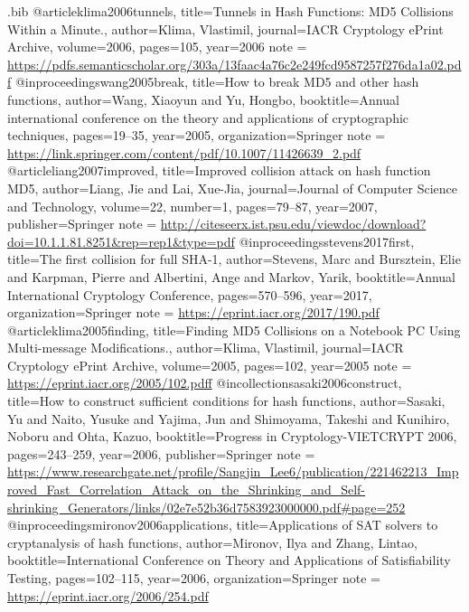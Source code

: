 \usepackage{filecontents}
\newtheorem{theorem}{Theorem}

\begin{filecontents}{\jobname.bib}
  @article{klima2006tunnels,
  title={Tunnels in Hash Functions: MD5 Collisions Within a Minute.},
  author={Klima, Vlastimil},
  journal={IACR Cryptology ePrint Archive},
  volume={2006},
  pages={105},
  year={2006}
  note =         {\url{https://pdfs.semanticscholar.org/303a/13faac4a76c2e249fcd9587257f276da1a02.pdf}}
}
@inproceedings{wang2005break,
  title={How to break MD5 and other hash functions},
  author={Wang, Xiaoyun and Yu, Hongbo},
  booktitle={Annual international conference on the theory and applications of cryptographic techniques},
  pages={19--35},
  year={2005},
  organization={Springer}
  note =         {\url{https://link.springer.com/content/pdf/10.1007/11426639_2.pdf}}
}
@article{liang2007improved,
  title={Improved collision attack on hash function MD5},
  author={Liang, Jie and Lai, Xue-Jia},
  journal={Journal of Computer Science and Technology},
  volume={22},
  number={1},
  pages={79--87},
  year={2007},
  publisher={Springer}
  note =         {\url{http://citeseerx.ist.psu.edu/viewdoc/download?doi=10.1.1.81.8251&rep=rep1&type=pdf}}
}
@inproceedings{stevens2017first,
  title={The first collision for full SHA-1},
  author={Stevens, Marc and Bursztein, Elie and Karpman, Pierre and Albertini, Ange and Markov, Yarik},
  booktitle={Annual International Cryptology Conference},
  pages={570--596},
  year={2017},
  organization={Springer}
  note =         {\url{https://eprint.iacr.org/2017/190.pdf}}
}
@article{klima2005finding,
  title={Finding MD5 Collisions on a Notebook PC Using Multi-message Modifications.},
  author={Klima, Vlastimil},
  journal={IACR Cryptology ePrint Archive},
  volume={2005},
  pages={102},
  year={2005}
  note =         {\url{https://eprint.iacr.org/2005/102.pdff}}
}
@incollection{sasaki2006construct,
  title={How to construct sufficient conditions for hash functions},
  author={Sasaki, Yu and Naito, Yusuke and Yajima, Jun and Shimoyama, Takeshi and Kunihiro, Noboru and Ohta, Kazuo},
  booktitle={Progress in Cryptology-VIETCRYPT 2006},
  pages={243--259},
  year={2006},
  publisher={Springer}
  note = {\url{https://www.researchgate.net/profile/Sangjin_Lee6/publication/221462213_Improved_Fast_Correlation_Attack_on_the_Shrinking_and_Self-shrinking_Generators/links/02e7e52b36d7583923000000.pdf#page=252}}
}
@inproceedings{mironov2006applications,
  title={Applications of SAT solvers to cryptanalysis of hash functions},
  author={Mironov, Ilya and Zhang, Lintao},
  booktitle={International Conference on Theory and Applications of Satisfiability Testing},
  pages={102--115},
  year={2006},
  organization={Springer}
  note = {\url{https://eprint.iacr.org/2006/254.pdf}}
}
\end{filecontents}


